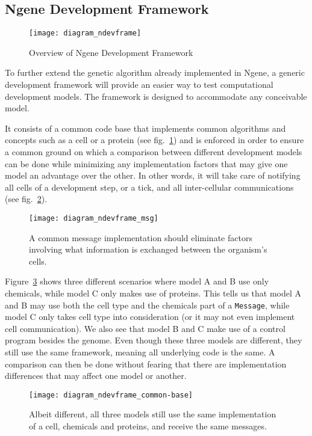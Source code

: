 \subsection{Ngene Development Framework}
\begin{figure}[!ht]
	\centering
	\texttt{[image: diagram\_ndevframe]}
	\caption{Overview of Ngene Development Framework}
	\label{fig:diagram_ndevframe}
\end{figure}

To further extend the genetic algorithm already implemented in Ngene, a generic development framework will provide an easier way to test computational development models. The framework is designed to accommodate any conceivable model.

It consists of a common code base that implements common algorithms and concepts such as a cell or a protein (see fig.~\ref{fig:diagram_ndevframe}) and is enforced in order to ensure a common ground on which a comparison between different development models can be done while minimizing any implementation factors that may give one model an advantage over the other. In other words, it will take care of notifying all cells of a development step, or a tick, and all inter-cellular communications (see fig.~\ref{fig:diagram_ndevframe_msg}).

\begin{figure}[!ht]
	\centering
	\texttt{[image: diagram\_ndevframe\_msg]}
	\caption{A common message implementation should eliminate factors involving what information is exchanged between the organism's cells.}
	\label{fig:diagram_ndevframe_msg}
\end{figure}

Figure~\ref{fig:diagram_ndevframe_common-base} shows three different scenarios where model A and B use only chemicals, while model C only makes use of proteins. This tells us that model A and B may use both the cell type and the chemicals part of a \texttt{Message}, while model C only takes cell type into consideration (or it may not even implement cell communication). We also see that model B and C make use of a control program besides the genome. Even though these three models are different, they still use the same framework, meaning all underlying code is the same. A comparison can then be done without fearing that there are implementation differences that may affect one model or another.

\begin{figure}[!ht]
	\centering
	\texttt{[image: diagram\_ndevframe\_common-base]}
	\caption{Albeit different, all three models still use the same implementation of a cell, chemicals and proteins, and receive the same messages.}
	\label{fig:diagram_ndevframe_common-base}
\end{figure}


